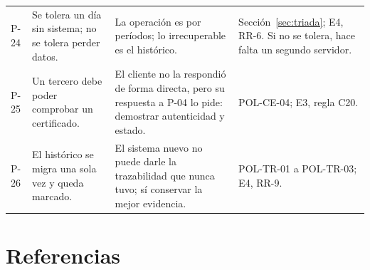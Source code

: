 \documentclass[11pt,letterpaper]{article}
\begin{document}
{\begin{longtable}{@{}L{1.2cm} L{4.5cm} L{5.5cm} L{4.2cm}@{}}
P-24 & Se tolera un día sin sistema; no se tolera perder datos. & La operación es por períodos; lo irrecuperable es el histórico. & Sección~\ref{sec:triada}; E4, RR-6. Si no se tolera, hace falta un segundo servidor. \\
P-25 & Un tercero debe poder comprobar un certificado. & El cliente no la respondió de forma directa, pero su respuesta a P-04 lo pide: demostrar autenticidad y estado. & POL-CE-04; E3, regla C20. \\
P-26 & El histórico se migra una sola vez y queda marcado. & El sistema nuevo no puede darle la trazabilidad que nunca tuvo; sí conservar la mejor evidencia. & POL-TR-01 a POL-TR-03; E4, RR-9. \\
\end{longtable}
}

\section*{Referencias}
\end{document}
